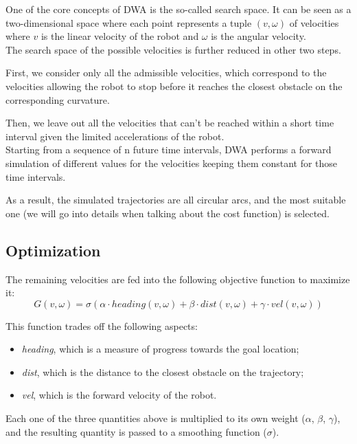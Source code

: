 \documentclass[11pt,a4paper]{article}
\begin{document}
One of the core concepts of DWA is the so-called search space. It can be seen as a two-dimensional space where each point represents a tuple $(v, \omega)$ of velocities where $v$ is the linear velocity of the robot and $\omega$ is the angular velocity.\\

The search space of the possible velocities is further reduced in other two steps.

First, we consider only all the admissible velocities, which correspond to the velocities allowing the robot to stop before it reaches the closest obstacle on the corresponding curvature.

Then, we leave out all the velocities that can't be reached within a short time interval
given the limited accelerations of the robot.\\

Starting from a sequence of n future time intervals, DWA performs a forward simulation of different values for the velocities keeping them constant for those time intervals.

As a result, the simulated trajectories are all circular arcs, and the most suitable one (we will go into details when talking about the cost function) is selected.

\subsection{Optimization}

The remaining velocities are fed into the following objective function to maximize it:
$$ G(v, \omega) = \sigma(\alpha \cdot heading(v, \omega) + \beta \cdot dist(v, \omega) + \gamma \cdot vel(v, \omega)) $$

This function trades off the following aspects:
\begin{itemize}
 \item \textit{heading}, which is a measure of progress towards the goal location;
 \item \textit{dist}, which is the distance to the closest obstacle on the trajectory;
 \item \textit{vel}, which is the forward velocity of the robot.\\
\end{itemize}

Each one of the three quantities above is multiplied to its own weight ($\alpha$, $\beta$, $\gamma$), and the resulting quantity is passed to a smoothing function ($\sigma$).
\end{document}
